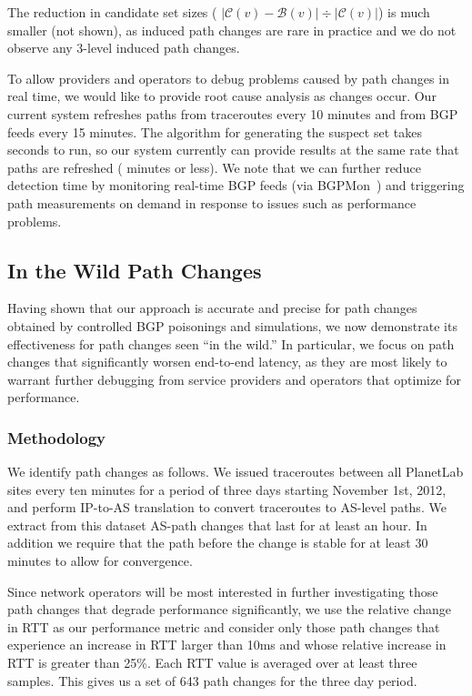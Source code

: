 The reduction in candidate set sizes (\ie
$|\mathcal{C}(v)-\mathcal{B}(v)|\div|\mathcal{C}(v)|$) is much smaller
(not shown), as induced path changes are rare in practice and we do not
observe any 3-level induced path changes.

To allow providers and operators to debug problems caused by 
path changes in real time, we would like \ouralgo to provide 
root cause analysis as changes occur. Our current system refreshes 
paths from traceroutes every 10 minutes and from BGP feeds 
every 15 minutes. The algorithm for generating the suspect set 
takes seconds to run, so our system currently can provide results 
at the same rate that paths are refreshed ( minutes or less). 
We note that we can 
further reduce detection time by monitoring real-time BGP feeds 
(\eg via BGPMon~\cite{bgpmon-pub}) and triggering path measurements 
on demand in response to issues such as performance problems. 

\subsection{In the Wild Path Changes}
\label{sec:eval-real}

Having shown that our approach is accurate and precise
for path changes obtained by controlled BGP poisonings and simulations,
we now demonstrate its effectiveness for path changes seen ``in the
wild.'' 
In particular, we focus on path changes that significantly worsen end-to-end latency, 
as they are most likely to warrant further debugging from service providers and 
operators that optimize for performance.

\subsubsection{Methodology}
We identify path changes as follows. We issued traceroutes between all PlanetLab sites every ten minutes for
a period of three days starting November 1st, 2012, and perform IP-to-AS
translation to convert traceroutes to AS-level paths.  
We extract from this dataset AS-path changes that last for at least an hour. 
In addition we require that the path before the change is stable for at least
30 minutes to allow for convergence.  

Since network operators will be most interested in further investigating those 
path changes that degrade performance significantly, we use 
the relative change in RTT as our performance metric and consider only those
path changes that experience an increase in RTT larger than 10ms and whose
relative increase in RTT is greater than 25\%. Each RTT value is averaged over
at least three samples. This gives us a set of 643 path changes for the three day
period. 

